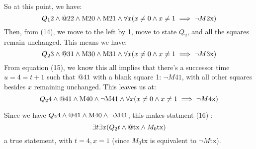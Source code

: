 \begin{enumerate}
    So at this point, we have:
    $$Q_12 \land \text{@22} \land \text{M20} \land \text{M21} \land \forall x (x \neq 0 \land x \neq 1 \implies \neg M \text{2x})$$ 
    Then, from (14), we move to the left by 1, move to state $Q_2$, and all the squares remain unchanged. This means we have:
    $$Q_23 \land \text{@31} \land \text{M30} \land \text{M31} \land \forall x (x \neq 0 \land x \neq 1 \implies \neg M \text{3x})$$
    From equation (15), we know this all implies that there's a successor time $u=4=t+1$ such that $\text{@41}$ with a blank square 1: $\neg M \text{41}$, with all other squares besides $x$ remaining unchanged. This leaves us at:
    $$Q_24 \land \text{@41} \land \text{M40} \land \neg \text{M41} \land \forall x (x \neq 0 \land x \neq 1 \implies \neg M \text{4x})$$

    Since we have $Q_24 \land \text{@41} \land \text{M40} \land \neg \text{M41}$, this makes statment (16) : $$\exists t \exists x (Q_2t \land \text{@tx} \land M_0 \text{tx})$$ a true statement, with $t=4, x=1$ (since $M_0 \text{tx}$ is equivalent to $\neg M \text{tx}$).

\end{enumerate}

